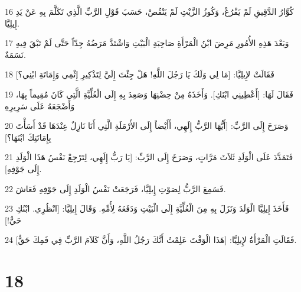 \par 16 كُوَّارُ الدَّقِيقِ لَمْ يَفْرُغْ، وَكُوزُ الزَّيْتِ لَمْ يَنْقُصْ، حَسَبَ قَوْلِ الرَّبِّ الَّذِي تَكَلَّمَ بِهِ عَنْ يَدِ إِيلِيَّا.
\par 17 وَبَعْدَ هَذِهِ الأُمُورِ مَرِضَ ابْنُ الْمَرْأَةِ صَاحِبَةِ الْبَيْتِ وَاشْتَدَّ مَرَضُهُ جِدّاً حَتَّى لَمْ تَبْقَ فِيهِ نَسَمَةٌ.
\par 18 فَقَالَتْ لإِيلِيَّا: [مَا لِي وَلَكَ يَا رَجُلَ اللَّهِ! هَلْ جِئْتَ إِلَيَّ لِتَذْكِيرِ إِثْمِي وَإِمَاتَةِ ابْنِي؟]
\par 19 فَقَالَ لَهَا: [أَعْطِينِي ابْنَكِ]. وَأَخَذَهُ مِنْ حِضْنِهَا وَصَعِدَ بِهِ إِلَى الْعُلِّيَّةِ الَّتِي كَانَ مُقِيماً بِهَا، وَأَضْجَعَهُ عَلَى سَرِيرِهِ
\par 20 وَصَرَخَ إِلَى الرَّبِّ: [أَيُّهَا الرَّبُّ إِلَهِي، أَأَيْضاً إِلَى الأَرْمَلَةِ الَّتِي أَنَا نَازِلٌ عِنْدَهَا قَدْ أَسَأْتَ بِإِمَاتَتِكَ ابْنَهَا؟]
\par 21 فَتَمَدَّدَ عَلَى الْوَلَدِ ثَلاَثَ مَرَّاتٍ، وَصَرَخَ إِلَى الرَّبِّ: [يَا رَبُّ إِلَهِي، لِتَرْجِعْ نَفْسُ هَذَا الْوَلَدِ إِلَى جَوْفِهِ].
\par 22 فَسَمِعَ الرَّبُّ لِصَوْتِ إِيلِيَّا، فَرَجَعَتْ نَفْسُ الْوَلَدِ إِلَى جَوْفِهِ فَعَاشَ.
\par 23 فَأَخَذَ إِيلِيَّا الْوَلَدَ وَنَزَلَ بِهِ مِنَ الْعُلِّيَّةِ إِلَى الْبَيْتِ وَدَفَعَهُ لِأُمِّهِ. وَقَالَ إِيلِيَّا: [انْظُرِي. ابْنُكِ حَيٌّ!]
\par 24 فَقَالَتِ الْمَرْأَةُ لإِيلِيَّا: [هَذَا الْوَقْتَ عَلِمْتُ أَنَّكَ رَجُلُ اللَّهِ، وَأَنَّ كَلاَمَ الرَّبِّ فِي فَمِكَ حَقٌّ].

\chapter{18}

